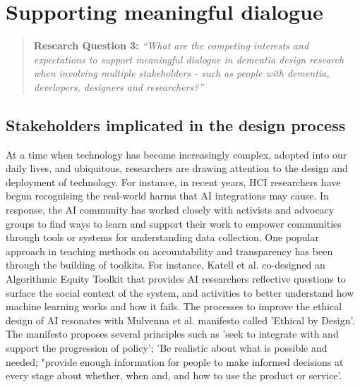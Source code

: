 \section{Supporting meaningful dialogue}
\label{Discussion:RQ3}
\begin{quote}
\textbf{    Research Question 3:
}    
\textit{ “What are the competing interests and expectations to support meaningful dialogue in dementia design research when involving multiple stakeholders - such as people with dementia, developers, designers and researchers?”}
\end{quote}

\subsection{Stakeholders implicated in the design process}
\label{DevsDesigners}
At a time when technology has become increasingly complex, adopted into our daily lives, and ubiquitous, researchers are drawing attention to the design and deployment of technology. For instance, in recent years, HCI researchers have begun recognising the 
real-world harms that AI integrations may cause. In response, the AI community has worked closely with activists and advocacy groups to find ways to learn and support their work to empower communities through tools or systems for understanding data collection. One popular approach in teaching methods on accountability and transparency has been through the building of toolkits. For instance, Katell et al. co-designed an Algorithmic Equity Toolkit that provides AI researchers reflective questions to surface the social context of the system, and activities to better understand how machine learning works and how it fails. The processes to improve the ethical design of AI resonates with Mulvenna et al. manifesto called 'Ethical by Design'. The manifesto proposes several principles such as 'seek to integrate with and support the progression of policy'; 'Be realistic about what is possible and needed; "provide enough information for people to make informed decisions at every stage about whether, when and, and how to use the product or service'. 

